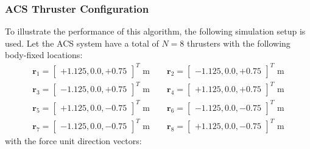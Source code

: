 \subsubsection{ACS Thruster Configuration}
To illustrate the performance of this algorithm, the following simulation setup is used.  Let the ACS system have a total of $N = 8$ thrusters with the following body-fixed locations:
\begin{gather*}
	\label{eq:th:loc}
	\bm r_{1} = \begin{bmatrix} +1.125, 0.0, +0.75  \end{bmatrix}^{T} \text{ m}
	\quad\quad
	\bm r_{2} = \begin{bmatrix} -1.125, 0.0, +0.75  \end{bmatrix}^{T} \text{ m}
	\\
	\bm r_{3} = \begin{bmatrix} -1.125, 0.0, +0.75  \end{bmatrix}^{T}	 \text{ m}
	\quad\quad
	\bm r_{4} = \begin{bmatrix} +1.125, 0.0, +0.75  \end{bmatrix}^{T} \text{ m}
	\\
	\bm r_{5} = \begin{bmatrix} +1.125, 0.0, -0.75  \end{bmatrix}^{T}	 \text{ m}
	\quad\quad
	\bm r_{6} = \begin{bmatrix} -1.125, 0.0, -0.75  \end{bmatrix}^{T} \text{ m}
	\\
	\bm r_{7} = \begin{bmatrix} -1.125, 0.0, -0.75  \end{bmatrix}^{T}	 \text{ m}
	\quad\quad
	\bm r_{8} = \begin{bmatrix} +1.125, 0.0, -0.75  \end{bmatrix}^{T} \text{ m}
\end{gather*}
with the force unit direction vectors:
